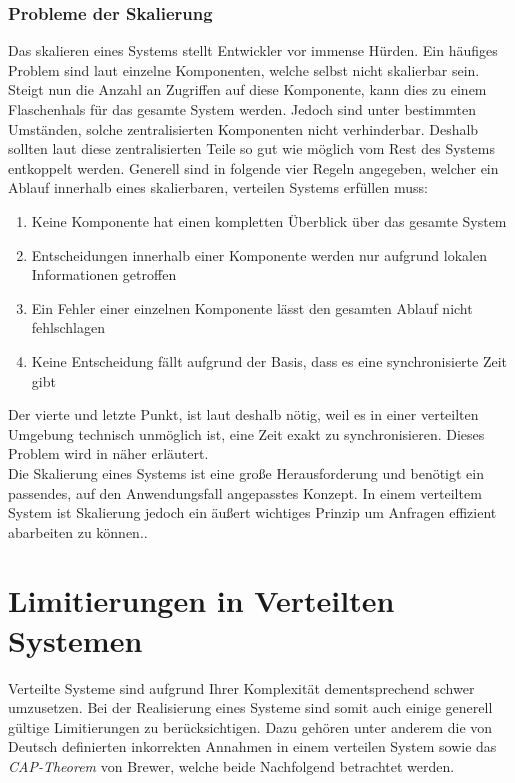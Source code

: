 \subsubsection{Probleme der Skalierung}
Das skalieren eines Systems stellt Entwickler vor immense Hürden. Ein häufiges Problem sind laut \cite{tanenbaum2007distributed} einzelne Komponenten, welche selbst nicht skalierbar sein. Steigt nun die Anzahl an Zugriffen auf diese Komponente, kann dies zu einem Flaschenhals für das gesamte System werden. Jedoch sind unter bestimmten Umständen, solche zentralisierten Komponenten nicht verhinderbar. Deshalb sollten laut \cite{tanenbaum2007distributed} diese zentralisierten Teile so gut wie möglich vom Rest des Systems entkoppelt werden. Generell sind in \cite{tanenbaum2007distributed} folgende vier Regeln angegeben, welcher ein Ablauf innerhalb eines skalierbaren, verteilen Systems erfüllen muss:
\begin{enumerate}
    \item Keine Komponente hat einen kompletten Überblick über das gesamte System
    \item Entscheidungen innerhalb einer Komponente werden nur aufgrund lokalen Informationen getroffen
    \item Ein Fehler einer einzelnen Komponente lässt den gesamten Ablauf nicht fehlschlagen
    \item Keine Entscheidung fällt aufgrund der Basis, dass es eine synchronisierte Zeit gibt
\end{enumerate}
Der vierte und letzte Punkt, ist laut \cite{tanenbaum2007distributed} deshalb nötig, weil es in einer verteilten Umgebung technisch unmöglich ist, eine Zeit exakt zu synchronisieren. Dieses Problem wird in \cite{lamport1978time} näher erläutert.\\
Die Skalierung eines Systems ist eine große Herausforderung und benötigt ein passendes, auf den Anwendungsfall angepasstes Konzept. In einem verteiltem System ist Skalierung jedoch ein äußert wichtiges Prinzip um Anfragen effizient abarbeiten zu können.. \cite{tanenbaum2007distributed}
 
\section{Limitierungen in Verteilten Systemen}
Verteilte Systeme sind aufgrund Ihrer Komplexität dementsprechend schwer umzusetzen. Bei der Realisierung eines Systeme sind somit auch einige generell gültige Limitierungen zu berücksichtigen. Dazu gehören unter anderem die von Deutsch definierten inkorrekten Annahmen in einem verteilen System sowie das \textit{CAP-Theorem} von Brewer, welche beide Nachfolgend betrachtet werden.

